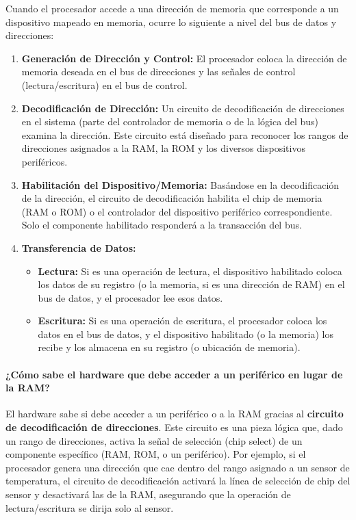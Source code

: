 \documentclass[12pt]{article}
\begin{document}
Cuando el procesador accede a una dirección de memoria que corresponde a un dispositivo mapeado en memoria, ocurre lo siguiente a nivel del bus de datos y direcciones:
\begin{enumerate}
    \item \textbf{Generación de Dirección y Control:} El procesador coloca la dirección de memoria deseada en el bus de direcciones y las señales de control (lectura/escritura) en el bus de control.
    \item \textbf{Decodificación de Dirección:} Un circuito de decodificación de direcciones en el sistema (parte del controlador de memoria o de la lógica del bus) examina la dirección. Este circuito está diseñado para reconocer los rangos de direcciones asignados a la RAM, la ROM y los diversos dispositivos periféricos.
    \item \textbf{Habilitación del Dispositivo/Memoria:} Basándose en la decodificación de la dirección, el circuito de decodificación habilita el chip de memoria (RAM o ROM) o el controlador del dispositivo periférico correspondiente. Solo el componente habilitado responderá a la transacción del bus.
    \item \textbf{Transferencia de Datos:}
    \begin{itemize}
        \item \textbf{Lectura:} Si es una operación de lectura, el dispositivo habilitado coloca los datos de su registro (o la memoria, si es una dirección de RAM) en el bus de datos, y el procesador lee esos datos.
        \item \textbf{Escritura:} Si es una operación de escritura, el procesador coloca los datos en el bus de datos, y el dispositivo habilitado (o la memoria) los recibe y los almacena en su registro (o ubicación de memoria).
    \end{itemize}
\end{enumerate}

\paragraph{¿Cómo sabe el hardware que debe acceder a un periférico en lugar de la RAM?}
El hardware sabe si debe acceder a un periférico o a la RAM gracias al \textbf{circuito de decodificación de direcciones}. Este circuito es una pieza lógica que, dado un rango de direcciones, activa la señal de selección (chip select) de un componente específico (RAM, ROM, o un periférico). Por ejemplo, si el procesador genera una dirección que cae dentro del rango asignado a un sensor de temperatura, el circuito de decodificación activará la línea de selección de chip del sensor y desactivará las de la RAM, asegurando que la operación de lectura/escritura se dirija solo al sensor.
\end{document}
